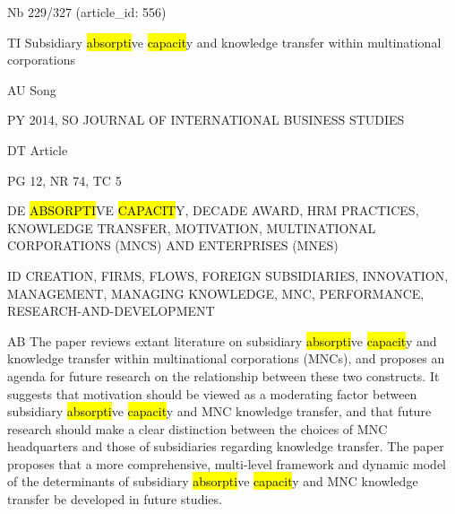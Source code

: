 \documentclass[a4paper]{article}
\begin{document}
\vspace*{-2cm}
Nb \tabto{0cm}229/327 (article\_id: 556)\par
TI \tabto{0cm}Subsidiary \hl{absorpti}ve \hl{capacit}y and knowledge transfer within multinational corporations\par
AU \tabto{0cm}Song\par
PY \tabto{0cm}2014, SO JOURNAL OF INTERNATIONAL BUSINESS STUDIES\par
DT \tabto{0cm}Article\par
PG \tabto{0cm}12, NR 74, TC 5\par
DE \tabto{0cm}\hl{ABSORPTI}VE \hl{CAPACIT}Y, DECADE AWARD, HRM PRACTICES, KNOWLEDGE TRANSFER, MOTIVATION, MULTINATIONAL CORPORATIONS (MNCS) AND ENTERPRISES (MNES)\par
ID \tabto{0cm}CREATION, FIRMS, FLOWS, FOREIGN SUBSIDIARIES, INNOVATION, MANAGEMENT, MANAGING KNOWLEDGE, MNC, PERFORMANCE, RESEARCH-AND-DEVELOPMENT\par
AB \tabto{0cm}The paper reviews extant literature on subsidiary \hl{absorpti}ve \hl{capacit}y and knowledge transfer within multinational corporations (MNCs), and proposes an agenda for future research on the relationship between these two constructs. It suggests that motivation should be viewed as a moderating factor between subsidiary \hl{absorpti}ve \hl{capacit}y and MNC knowledge transfer, and that future research should make a clear distinction between the choices of MNC headquarters and those of subsidiaries regarding knowledge transfer. The paper proposes that a more comprehensive, multi-level framework and dynamic model of the determinants of subsidiary \hl{absorpti}ve \hl{capacit}y and MNC knowledge transfer be developed in future studies.\par
\clearpage
\end{document}
